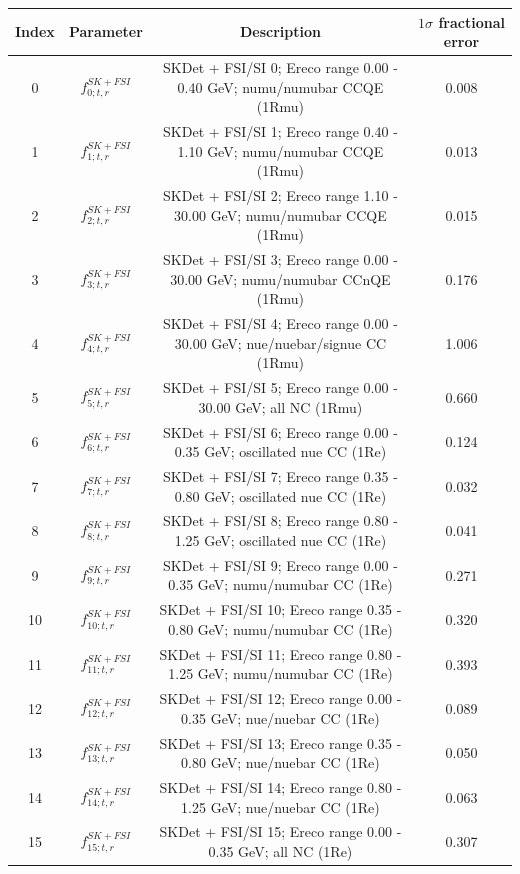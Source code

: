 \begin{tabular} { | c | c | c | c |  }
\hline 
Index & Parameter & Description & $1\sigma$ fractional error\\ 
\hline 
0 & $f_{0; t, r}^{SK+FSI}$ & SKDet + FSI/SI  0; Ereco range 0.00 - 0.40 GeV; numu/numubar CCQE (1Rmu) & 0.008\\ 
1 & $f_{1; t, r}^{SK+FSI}$ & SKDet + FSI/SI  1; Ereco range 0.40 - 1.10 GeV; numu/numubar CCQE (1Rmu) & 0.013\\ 
2 & $f_{2; t, r}^{SK+FSI}$ & SKDet + FSI/SI  2; Ereco range 1.10 - 30.00 GeV; numu/numubar CCQE (1Rmu) & 0.015\\ 
3 & $f_{3; t, r}^{SK+FSI}$ & SKDet + FSI/SI  3; Ereco range 0.00 - 30.00 GeV; numu/numubar CCnQE (1Rmu) & 0.176\\ 
4 & $f_{4; t, r}^{SK+FSI}$ & SKDet + FSI/SI  4; Ereco range 0.00 - 30.00 GeV; nue/nuebar/signue CC (1Rmu) & 1.006\\ 
5 & $f_{5; t, r}^{SK+FSI}$ & SKDet + FSI/SI  5; Ereco range 0.00 - 30.00 GeV; all NC (1Rmu) & 0.660\\ 
6 & $f_{6; t, r}^{SK+FSI}$ & SKDet + FSI/SI  6; Ereco range 0.00 - 0.35 GeV; oscillated nue CC (1Re) & 0.124\\ 
7 & $f_{7; t, r}^{SK+FSI}$ & SKDet + FSI/SI  7; Ereco range 0.35 - 0.80 GeV; oscillated nue CC (1Re) & 0.032\\ 
8 & $f_{8; t, r}^{SK+FSI}$ & SKDet + FSI/SI  8; Ereco range 0.80 - 1.25 GeV; oscillated nue CC (1Re) & 0.041\\ 
9 & $f_{9; t, r}^{SK+FSI}$ & SKDet + FSI/SI  9; Ereco range 0.00 - 0.35 GeV; numu/numubar CC (1Re) & 0.271\\ 
10 & $f_{10; t, r}^{SK+FSI}$ & SKDet + FSI/SI 10; Ereco range 0.35 - 0.80 GeV; numu/numubar CC (1Re) & 0.320\\ 
11 & $f_{11; t, r}^{SK+FSI}$ & SKDet + FSI/SI 11; Ereco range 0.80 - 1.25 GeV; numu/numubar CC (1Re) & 0.393\\ 
12 & $f_{12; t, r}^{SK+FSI}$ & SKDet + FSI/SI 12; Ereco range 0.00 - 0.35 GeV; nue/nuebar CC (1Re) & 0.089\\ 
13 & $f_{13; t, r}^{SK+FSI}$ & SKDet + FSI/SI 13; Ereco range 0.35 - 0.80 GeV; nue/nuebar CC (1Re) & 0.050\\ 
14 & $f_{14; t, r}^{SK+FSI}$ & SKDet + FSI/SI 14; Ereco range 0.80 - 1.25 GeV; nue/nuebar CC (1Re) & 0.063\\ 
15 & $f_{15; t, r}^{SK+FSI}$ & SKDet + FSI/SI 15; Ereco range 0.00 - 0.35 GeV; all NC (1Re) & 0.307\\ 

\end{tabular}

